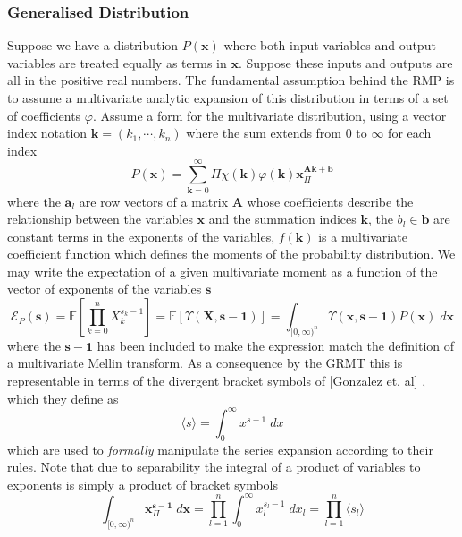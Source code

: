 \documentclass[journal=jcisd8,manuscript=article,layout=onecolumn,pdftex,floatfix,amsmath,amssymb,10pt]{achemso}
\begin{document}
\subsubsection{Generalised Distribution}
Suppose we have a distribution $P(\mathbf{x})$ where both input variables and output variables are treated equally as terms in $\mathbf{x}$. Suppose these inputs and outputs are all in the positive real numbers. The fundamental assumption behind the RMP is to assume a multivariate analytic expansion of this distribution in terms of a set of coefficients $\varphi$. Assume a form for the multivariate distribution, using a vector index notation $\mathbf{k} = (k_1, \cdots, k_n)$ where the sum extends from $0$ to $\infty$ for each index
\begin{equation}
P(\mathbf{x}) = \sum_{\mathbf{k}=0}^\infty  \Pi\chi(\mathbf{k})\varphi(\mathbf{k})\mathbf{x}^{\mathbf{A}\mathbf{k}+\mathbf{b}}_\Pi
\end{equation}
where the $\mathbf{a}_l$ are row vectors of a matrix $\mathbf{A}$ whose coefficients describe the relationship between the variables $\mathbf{x}$ and the summation indices $\mathbf{k}$, the $b_l \in \mathbf{b}$ are constant terms in the exponents of the variables, $f(\mathbf{k})$ is a multivariate coefficient function which defines the moments of the probability distribution. We may write the expectation of a given multivariate moment as a function of the vector of exponents of the variables $\mathbf{s}$
$$
\mathcal{E}_P(\mathbf{s}) = \mathbb{E}\left[\prod_{k=0}^n X_k^{s_k-1}\right] = \mathbb{E}\left[\Upsilon(\mathbf{X},\mathbf{s}-\mathbf{1})\right] =\int_{[0,\infty)^{n}} \Upsilon(\mathbf{x},\mathbf{s}-\mathbf{1}) P(\mathbf{x}) \; d \mathbf{x}
$$
where the $\mathbf{s}-\mathbf{1}$ has been included to make the expression match the definition of a multivariate Mellin transform. As a consequence by the GRMT this is representable in terms of the divergent bracket symbols of [Gonzalez et. al] \citep{Gonzalez2015}, which they define as
\begin{equation}
\langle s \rangle = \int_0^\infty x^{s-1} \; dx
\end{equation}
which are used to \emph{formally} manipulate the series expansion according to their rules. Note that due to separability the integral of a product of variables to exponents is simply a product of bracket symbols
\begin{equation}
\int_{[0,\infty)^n} \mathbf{x}^{\mathbf{s-1}}_\Pi\;d \mathbf{x} = \prod_{l=1}^n \int_0^\infty x_l^{s_l-1} \; dx_l = \prod_{l=1}^n \langle s_l \rangle
\label{eqn:bracket}
\end{equation} 
\end{document}
